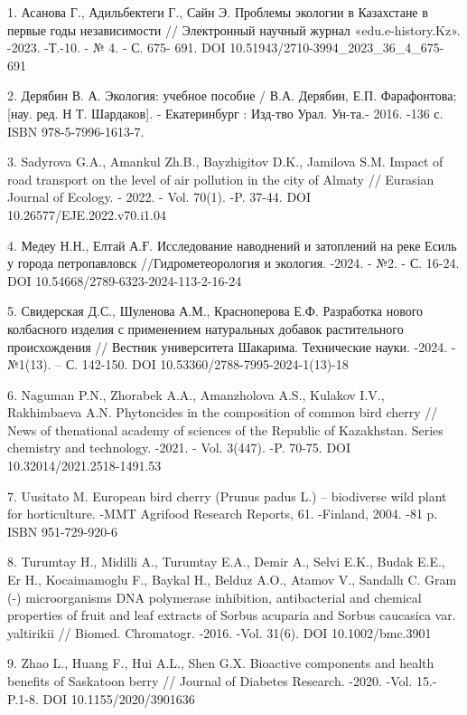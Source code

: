 \begin{references}
1. Асанова Г., Адильбектеги Г., Сайн Э. Проблемы экологии в Казахстане в
первые годы независимости // Электронный научный журнал
«edu.e-history.Kz». -2023. -Т.-10. - № 4. - С. 675- 691. DOI
10.51943/2710-3994\_2023\_36\_4\_675-691

2. Дерябин В. А. Экология: учебное пособие / В.А. Дерябин, Е.П.
Фарафонтова; {[}нау. ред. Н Т. Шардаков{]}. - Екатеринбург : Изд-тво
Урал. Ун-та.- 2016. -136 с. ISBN 978-5-7996-1613-7.

3. Sadyrova G.A., Amankul Zh.B., Bayzhigitov D.K., Jamilova S.M. Impact
of road transport on the level of air pollution in the city of Almaty
// Eurasian Journal of Ecology. - 2022. - Vol. 70(1). -P. 37-44. DOI
10.26577/EJE.2022.v70.i1.04

4. Медеу Н.Н., Елтай А.Ғ. Исследование наводнений и затоплений на реке
Есиль у города петропавловск //Гидрометеорология и экология. -2024. -
№2. - С. 16-24. DOI 10.54668/2789-6323-2024-113-2-16-24

5. Свидерская Д.С., Шуленова А.М., Красноперова Е.Ф. Разработка нового
колбасного изделия с применением натуральных добавок растительного
происхождения // Вестник университета Шакарима. Технические науки.
-2024. - №1(13). -- С. 142-150.
DOI 10.53360/2788-7995-2024-1(13)-18

6. Naguman P.N., Zhorabek A.A., Amanzholova A.S., Kulakov I.V.,
Rakhimbaeva A.N. Phytoncides in the composition of common bird cherry
// News of thenational academy of sciences of the Republic of
Kazakhstan. Series chemistry and technology. -2021. - Vol. 3(447). -P.
70-75. DOI 10.32014/2021.2518-1491.53

7. Uusitato M. European bird cherry (Prunus padus L.) -- biodiverse wild
plant for horticulture. -MMT Agrifood Research Reports, 61. -Finland,
2004. -81 p. ISBN 951-729-920-6

8. Turumtay H., Midilli A., Turumtay E.A., Demir A., Selvi E.K., Budak
E.E., Er H., Kocaimamoglu F., Baykal H., Belduz A.O., Atamov V.,
Sandallı C. Gram (-) microorganisms DNA polymerase inhibition,
antibacterial and chemical properties of fruit and leaf extracts of
Sorbus acuparia and Sorbus caucasica var. yaltirikii // Biomed.
Chromatogr. -2016. -Vol. 31(6). DOI 10.1002/bmc.3901

9. Zhao L., Huang F., Hui A.L., Shen G.X. Bioactive components and health
benefits of Saskatoon berry // Journal of Diabetes Research. -2020.
-Vol. 15.- P.1-8. DOI 10.1155/2020/3901636


\end{references}

